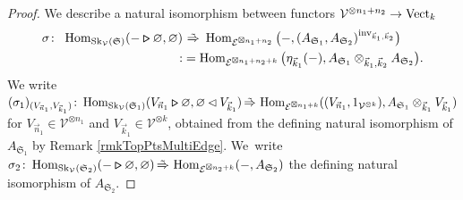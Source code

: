 \documentclass[pdftex]{sigma}%
\numberwithin{equation}{section}
\newcommand{\Hom}{\operatorname{Hom}}
\newcommand{\bmrhd}{\bm{\triangleright}}
\begin{document}
\begin{proof}
We describe a natural isomorphism between functors $\mathcal{V}^{\otimes n_1+n_2} \to {\rm Vect}_k$
\begin{gather*}
\begin{split}
\sigma\colon\ \Hom_{{\rm Sk}_\mathcal{V}(\mathfrak{S})}(-\bmrhd\varnothing,\varnothing) & \ \tilde{\Rightarrow}\ \Hom_{\mathcal{E}^{\boxtimes n_1+n_2}}\big({-},(A_{\mathfrak{S}_1}, A_{\mathfrak{S}_2})^{{\rm inv}_{\vec{k}_1,\vec{k}_2}}\big)
\\
:&=\Hom_{\mathcal{E}^{\boxtimes n_1+n_2+k}}\big(\eta_{\vec{k}_1}(-),A_{\mathfrak{S}_1} \otimes_{\vec{k}_1,\vec{k}_2} A_{\mathfrak{S}_2}\big).
\end{split}
\end{gather*}
We write $(\sigma_1)_{(V_{\vec{n}_1},V_{\vec{k}_1})}\colon \Hom_{{\rm Sk}_\mathcal{V}(\mathfrak{S}_1)}(V_{\vec{n}_1}\bmrhd \varnothing,\varnothing\lhd V_{\vec{k}_1}) \,\tilde{\Rightarrow}\, \Hom_{\mathcal{E}^{\boxtimes n_1+k}}((V_{\vec{n}_1},1_{\mathcal{V}^{\otimes k}}), A_{\mathfrak{S}_1}\otimes_{\vec{k}_1} V_{\vec{k}_1})$ for $V_{\vec{n}_1} \in \mathcal{V}^{\otimes n_1}$ and $V_{\vec{k}_1} \in \mathcal{V}^{\otimes k}$, obtained from the defining natural isomorphism of $A_{\mathfrak{S}_1}$ by Remark \ref{rmkTopPtsMultiEdge}. We~write $\sigma_2\colon \Hom_{{\rm Sk}_\mathcal{V}(\mathfrak{S}_2)}(-\bmrhd\varnothing,\varnothing) \,\tilde{\Rightarrow}\, \Hom_{\mathcal{E}^{\boxtimes n_2+k}}(-,A_{\mathfrak{S}_2})$ the defining natural isomorphism of $A_{\mathfrak{S}_2}$.


\end{proof}
\end{document}
